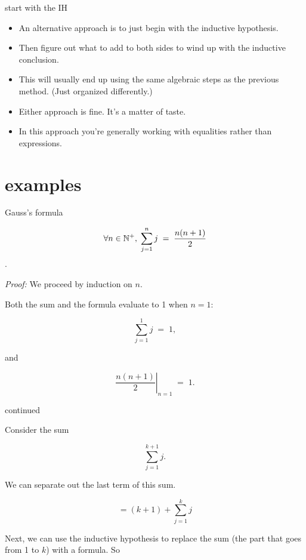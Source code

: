 \documentclass[handout,landscape]{beamer}
\begin{document}
\begin{frame}{start with the IH}
\begin{itemize}
\item An alternative approach is to just begin with the inductive hypothesis. \pause
\item Then figure out what to add to both sides to wind up with the inductive conclusion. \pause
\item This will usually end up using the same algebraic steps as the previous method.\pause \newline
(Just organized differently.) \pause
\item Either approach is fine.  It's a matter of taste. \pause
\item In this approach you're generally working with equalities rather than expressions.
\end{itemize}
\end{frame}

\section{examples}

\begin{frame}{Gauss's formula}
\begin{thm*} 
$$ \forall n \in {\mathbb N}^+, \; \sum_{j=1}^{n} j \; = \; \frac{n(n+1)}{2} $$.
\end{thm*}
{\em Proof:} We proceed by induction on $n$.

  Both the sum and the formula evaluate to 1 when $n=1$:

\[ \sum_{j=1}^{1} j \; = \; 1, \]

and 

\[ \left. \frac{n(n+1)}{2} \right|_{n=1} \; = \; 1. \]

\end{frame}

\begin{frame}{continued}

  Consider the sum

\[ \sum_{j=1}^{k+1} j. \]

We can separate out the last term of this sum.

\[ = (k+1) + \sum_{j=1}^{k} j \]

Next, we can use the inductive hypothesis to replace the sum (the part 
that goes from 1 to $k$) with a formula.  So 

\end{frame}
\end{document}
